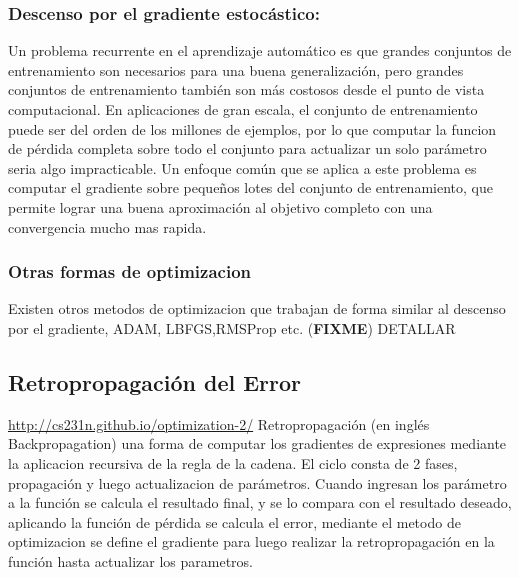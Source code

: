 \documentclass[a4paper,11pt,spanish]{book}
\newcommand*{\FIXME}[1]{{(\textbf{FIXME}) {#1}}}
\begin{document}
      \subsubsection{Descenso por el gradiente estocástico:}
	Un problema recurrente en el aprendizaje automático es que grandes conjuntos de entrenamiento son necesarios para una buena generalización, 
	pero grandes conjuntos de entrenamiento también son más costosos desde el punto de vista computacional.
	En aplicaciones de gran escala, el conjunto de entrenamiento puede ser del orden de los millones de ejemplos, por lo que computar la funcion de 
	pérdida completa sobre todo el conjunto para actualizar un solo parámetro seria algo impracticable.
	Un enfoque común que se aplica a este problema es computar el gradiente sobre pequeños lotes del conjunto de entrenamiento, 
	que permite lograr una buena aproximación al objetivo completo con una convergencia mucho mas rapida.


      \subsubsection{Otras formas de optimizacion}
	Existen otros metodos de optimizacion que trabajan de forma similar al descenso por el gradiente, ADAM, LBFGS,RMSProp etc. 
	\FIXME{DETALLAR} 
	
    \subsection{Retropropagación del Error}
      \url{http://cs231n.github.io/optimization-2/}
      Retropropagación (en inglés Backpropagation) una forma  de computar los gradientes de expresiones mediante la aplicacion recursiva de la regla de la cadena.
      El ciclo consta de 2 fases, propagación y luego actualizacion de parámetros. Cuando ingresan los parámetro a la función se calcula el resultado final, y se lo compara con el resultado 
      deseado, aplicando la función de pérdida se calcula el error, mediante el metodo de optimizacion se define el gradiente para luego realizar la retropropagación en la función hasta 
      actualizar los parametros.
\end{document}
